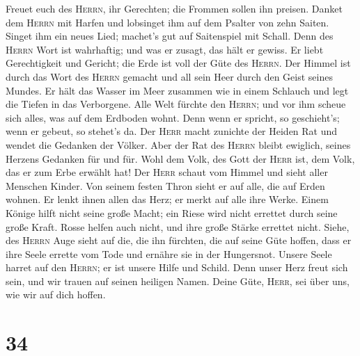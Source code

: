  Freuet euch des \textsc{Herrn}, ihr Gerechten; die
Frommen sollen ihn preisen.  Danket dem \textsc{Herrn} mit
Harfen und lobsinget ihm auf dem Psalter von zehn Saiten. 
Singet ihm ein neues Lied; machet's gut auf Saitenspiel mit Schall.
 Denn des \textsc{Herrn} Wort ist wahrhaftig; und was er
zusagt, das hält er gewiss.  Er liebt Gerechtigkeit und
Gericht; die Erde ist voll der Güte des \textsc{Herrn}. 
Der Himmel ist durch das Wort des \textsc{Herrn} gemacht und all sein
Heer durch den Geist seines Mundes.  Er hält das Wasser im
Meer zusammen wie in einem Schlauch und legt die Tiefen in das
Verborgene.  Alle Welt fürchte den \textsc{Herrn}; und vor
ihm scheue sich alles, was auf dem Erdboden wohnt.  Denn
wenn er spricht, so geschieht's; wenn er gebeut, so stehet's da.
 Der \textsc{Herr} macht zunichte der Heiden Rat und
wendet die Gedanken der Völker.  Aber der Rat des
\textsc{Herrn} bleibt ewiglich, seines Herzens Gedanken für und für.
 Wohl dem Volk, des Gott der \textsc{Herr} ist, dem Volk,
das er zum Erbe erwählt hat!  Der \textsc{Herr} schaut
vom Himmel und sieht aller Menschen Kinder.  Von seinem
festen Thron sieht er auf alle, die auf Erden wohnen.  Er
lenkt ihnen allen das Herz; er merkt auf alle ihre Werke.
 Einem Könige hilft nicht seine große Macht; ein Riese
wird nicht errettet durch seine große Kraft.  Rosse
helfen auch nicht, und ihre große Stärke errettet nicht. 
Siehe, des \textsc{Herrn} Auge sieht auf die, die ihn fürchten, die auf
seine Güte hoffen,  dass er ihre Seele errette vom Tode
und ernähre sie in der Hungersnot.  Unsere Seele harret
auf den \textsc{Herrn}; er ist unsere Hilfe und Schild. 
Denn unser Herz freut sich sein, und wir trauen auf seinen heiligen
Namen.  Deine Güte, \textsc{Herr}, sei über uns, wie wir
auf dich hoffen.

\hypertarget{section-33}{%
\section{34}\label{section-33}}

